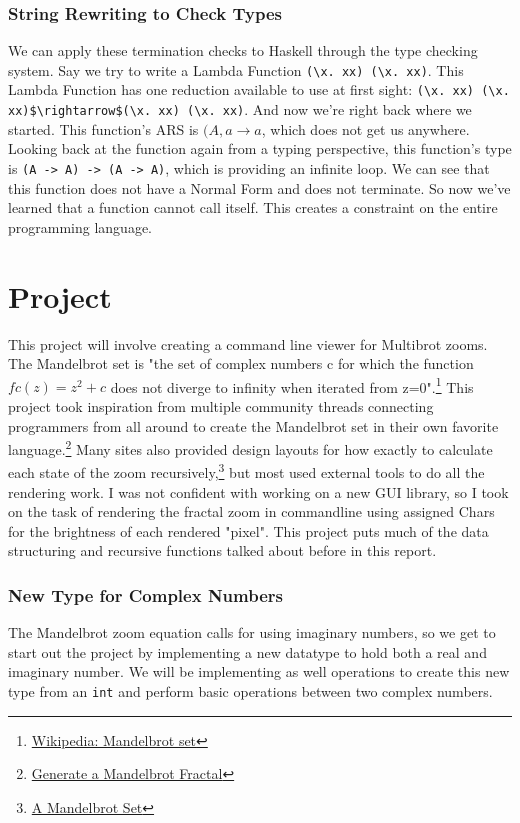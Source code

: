 \documentclass{article}
\begin{document}
        \subsubsection{String Rewriting to Check Types}
        We can apply these termination checks to Haskell through the type checking system. Say we try to write a Lambda Function \lstinline{(\x. xx) (\x. xx)}. This Lambda Function has one reduction available to use at first sight: \lstinline{(\x. xx) (\x. xx)$\rightarrow$(\x. xx) (\x. xx)}. And now we're right back where we started. This function's ARS is $(A,a \rightarrow a$, which does not get us anywhere. Looking back at the function again from a typing perspective, this function's type is \lstinline{(A -> A) -> (A -> A)}, which is providing an infinite loop. We can see that this function does not have a Normal Form and does not terminate. So now we've learned that a function cannot call itself. This creates a constraint on the entire programming language.
        

\clearpage
\section{Project}
    This project will involve creating a command line viewer for Multibrot zooms. The Mandelbrot set is "the set of complex numbers c for which the function $fc(z)=z^2+c$ does not diverge to infinity when iterated from z=0".\footnote{\href{https://en.wikipedia.org/wiki/Mandelbrot_set}{Wikipedia: Mandelbrot set}} This project took inspiration from multiple community threads connecting programmers from all around to create the Mandelbrot set in their own favorite language.\footnote{\href{https://codegolf.stackexchange.com/questions/3105/generate-a-mandelbrot-fractal}{Generate a Mandelbrot Fractal}} Many sites also provided design layouts for how exactly to calculate each state of the zoom recursively,\footnote{\href{https://typeclasses.com/art/mandelbrot}{A Mandelbrot Set}} but most used external tools to do all the rendering work. I was not confident with working on a new GUI library, so I took on the task of rendering the fractal zoom in commandline using assigned Chars for the brightness of each rendered "pixel". This project puts much of the data structuring and recursive functions talked about before in this report.
    
    \subsubsection{New Type for Complex Numbers}
    The Mandelbrot zoom equation calls for using imaginary numbers, so we get to start out the project by implementing a new datatype to hold both a real and imaginary number. We will be implementing as well operations to create this new type from an \lstinline{int} and perform basic operations between two complex numbers.
    
\end{document}
